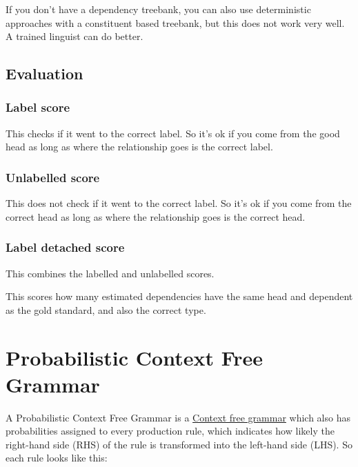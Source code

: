 \documentclass[
  11pt,
  british,
]{article}
\begin{document}
If you don't have a dependency treebank, you can also use deterministic
approaches with a constituent based treebank, but this does not work
very well. A trained linguist can do better.

\hypertarget{evaluation-1}{%
\subsection{Evaluation}\label{evaluation-1}}

\hypertarget{label-score}{%
\subsubsection{Label score}\label{label-score}}

This checks if it went to the correct label. So it's ok if you come from
the good head as long as where the relationship goes is the correct
label.

\hypertarget{unlabelled-score}{%
\subsubsection{Unlabelled score}\label{unlabelled-score}}

This does not check if it went to the correct label. So it's ok if you
come from the correct head as long as where the relationship goes is the
correct head.

\hypertarget{label-detached-score}{%
\subsubsection{Label detached score}\label{label-detached-score}}

This combines the labelled and unlabelled scores.

This scores how many estimated dependencies have the same head and
dependent as the gold standard, and also the correct type.

\hypertarget{probabilistic-context-free-grammar}{%
\section{Probabilistic Context Free
Grammar}\label{probabilistic-context-free-grammar}}

A Probabilistic Context Free Grammar is a
\href{Context\%20free\%20grammars.md}{Context free grammar} which also
has probabilities assigned to every production rule, which indicates how
likely the right-hand side (RHS) of the rule is transformed into the
left-hand side (LHS). So each rule looks like this:
\end{document}
